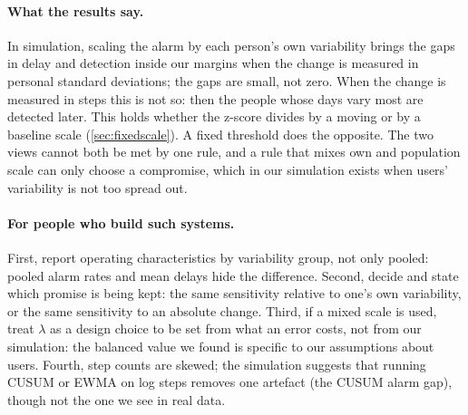 \documentclass[11pt,a4paper]{article}
\begin{document}
\paragraph{What the results say.}
In simulation, scaling the alarm by each person's own variability brings the gaps in delay and detection inside our margins when the change is measured in personal standard deviations; the gaps are small, not zero. When the change is measured in steps this is not so: then the people whose days vary most are detected later. This holds whether the z-score divides by a moving or by a baseline scale (\cref{sec:fixedscale}). A fixed threshold does the opposite. The two views cannot both be met by one rule, and a rule that mixes own and population scale can only choose a compromise, which in our simulation exists when users' variability is not too spread out.

\paragraph{For people who build such systems.}
First, report operating characteristics by variability group, not only pooled: pooled alarm rates and mean delays hide the difference. Second, decide and state which promise is being kept: the same sensitivity relative to one's own variability, or the same sensitivity to an absolute change. Third, if a mixed scale is used, treat $\lambda$ as a design choice to be set from what an error costs, not from our simulation: the balanced value we found is specific to our assumptions about users. Fourth, step counts are skewed; the simulation suggests that running CUSUM or EWMA on log steps removes one artefact (the CUSUM alarm gap), though not the one we see in real data.
\end{document}
